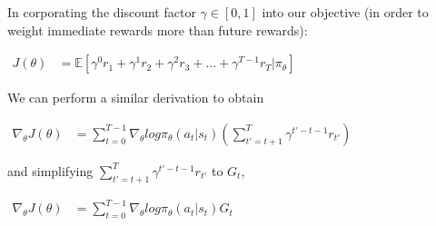 \documentclass[letterpaper,11pt]{article}
\begin{document}
In corporating the discount factor $\gamma \in [0,1]$ into our objective (in order to weight immediate rewards more than future rewards):

\begin{center}
$\begin{aligned}
    J(\theta) &= \mathbb{E}[\gamma^{0} r_{1} + \gamma^{1} r_{2} + \gamma^{2} r_{3} + ... + \gamma^{T-1} r_{T} | \pi_{\theta}]
\end{aligned}$
\end{center}

We can perform a similar derivation to obtain

\begin{center}
$\begin{aligned}
    \nabla_{\theta} J(\theta) &= \sum_{t=0}^{T-1} \nabla_{\theta} log \pi_{\theta} (a_{t} | s_{t}) (\sum_{t'=t+1}^{T} \gamma^{t' - t - 1} r_{t'})
\end{aligned}$
\end{center}

and simplifying $\sum_{t'=t+1}^{T} \gamma^{t' - t - 1} r_{t'}$ to $G_{t}$,

\begin{center}
$\begin{aligned}
    \nabla_{\theta} J(\theta) &= \sum_{t=0}^{T-1} \nabla_{\theta} log \pi_{\theta} (a_{t} | s_{t}) G_{t}
\end{aligned}$
\end{center}
\end{document}
